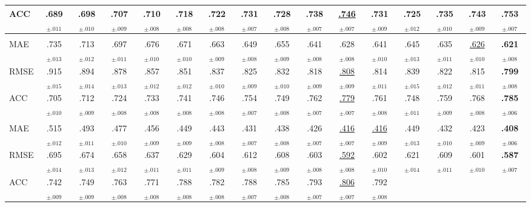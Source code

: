 \documentclass[10pt]{article}
\theoremstyle{plain}
\theoremstyle{definition}
\begin{document}
\begin{table}[ht!]
{\begin{tabular}{lccccc|cccccc|ccc|c}
ACC  & .689$_{\pm.011}$ & .698$_{\pm.010}$ & .707$_{\pm.009}$ & .710$_{\pm.008}$ & .718$_{\pm.008}$
     & .722$_{\pm.008}$ & .731$_{\pm.007}$ & .728$_{\pm.008}$ & .738$_{\pm.007}$ & \underline{.746}$_{\pm.007}$ & .731$_{\pm.009}$
     & .725$_{\pm.012}$ & .735$_{\pm.010}$ & .743$_{\pm.009}$ & \textbf{.753}$_{\pm.007}$ \\
\midrule
\rowcolor{gray!8}\multicolumn{16}{l}{\textbf{Amazon}} \\
MAE  & .735$_{\pm.013}$ & .713$_{\pm.012}$ & .697$_{\pm.011}$ & .676$_{\pm.010}$ & .671$_{\pm.010}$
     & .663$_{\pm.009}$ & .649$_{\pm.008}$ & .655$_{\pm.009}$ & .641$_{\pm.008}$ & .628$_{\pm.008}$ & .641$_{\pm.010}$
     & .645$_{\pm.013}$ & .635$_{\pm.011}$ & \underline{.626}$_{\pm.010}$ & \textbf{.621}$_{\pm.008}$ \\
RMSE & .915$_{\pm.015}$ & .894$_{\pm.014}$ & .878$_{\pm.013}$ & .857$_{\pm.012}$ & .851$_{\pm.012}$
     & .837$_{\pm.010}$ & .825$_{\pm.009}$ & .832$_{\pm.010}$ & .818$_{\pm.009}$ & \underline{.808}$_{\pm.009}$ & .814$_{\pm.011}$
     & .839$_{\pm.015}$ & .822$_{\pm.012}$ & .815$_{\pm.011}$ & \textbf{.799}$_{\pm.008}$ \\
ACC  & .705$_{\pm.010}$ & .712$_{\pm.009}$ & .724$_{\pm.008}$ & .733$_{\pm.008}$ & .741$_{\pm.008}$
     & .746$_{\pm.008}$ & .754$_{\pm.007}$ & .749$_{\pm.008}$ & .762$_{\pm.007}$ & \underline{.779}$_{\pm.007}$ & .761$_{\pm.008}$
     & .748$_{\pm.011}$ & .759$_{\pm.009}$ & .768$_{\pm.008}$ & \textbf{.785}$_{\pm.006}$ \\
\midrule
\rowcolor{gray!8}\multicolumn{16}{l}{\textbf{Douban}} \\
MAE  & .515$_{\pm.012}$ & .493$_{\pm.011}$ & .477$_{\pm.010}$ & .456$_{\pm.009}$ & .449$_{\pm.009}$
     & .443$_{\pm.008}$ & .431$_{\pm.007}$ & .438$_{\pm.008}$ & .426$_{\pm.007}$ & \underline{.416}$_{\pm.007}$ & \underline{.416}$_{\pm.009}$
     & .449$_{\pm.013}$ & .432$_{\pm.010}$ & .423$_{\pm.009}$ & \textbf{.408}$_{\pm.006}$ \\
RMSE & .695$_{\pm.014}$ & .674$_{\pm.013}$ & .658$_{\pm.012}$ & .637$_{\pm.011}$ & .629$_{\pm.011}$
     & .604$_{\pm.009}$ & .612$_{\pm.008}$ & .608$_{\pm.009}$ & .603$_{\pm.008}$ & \underline{.592}$_{\pm.008}$ & .602$_{\pm.010}$
     & .621$_{\pm.014}$ & .609$_{\pm.011}$ & .601$_{\pm.010}$ & \textbf{.587}$_{\pm.007}$ \\
ACC  & .742$_{\pm.009}$ & .749$_{\pm.009}$ & .763$_{\pm.008}$ & .771$_{\pm.008}$ & .788$_{\pm.008}$
     & .782$_{\pm.008}$ & .788$_{\pm.007}$ & .785$_{\pm.008}$ & .793$_{\pm.007}$ & \underline{.806}$_{\pm.007}$ & .792$_{\pm.008}$

\end{tabular}}
\end{table}
\end{document}
